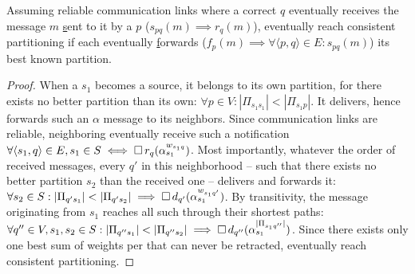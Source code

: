 \begin{theorem}
%
Assuming reliable communication links where a correct \process $q$
eventually receives the message $m$ \underline{s}ent to it by a
\process $p$ ($s_{pq}(m) \implies r_{q}(m)$), \processes eventually
reach consistent partitioning if each \process eventually
\underline{f}orwards ($f_p(m) \implies \forall \langle p, q\rangle \in
E: s_{pq}(m)$) its best known partition.
\end{theorem}

 

\begin{proof}
  When a \process $s_1$ becomes a source, it belongs to its own
  partition, for there exists no better partition than its own:
  $\forall p \in V: |\Pi_{s_1 s_1}| < |\Pi_{s_1 p}|$. It delivers,
  hence forwards such an $\alpha$ message to its neighbors. Since
  communication links are reliable, neighboring \processes eventually
  receive such a notification $\forall \langle s_1, q \rangle \in E,
  s_1 \in S \iff \square\, r_q(\alpha_{s_1}^{w_{s_1 q}})$. Most
  importantly, whatever the order of received messages, every \process
  $q'$ in this neighborhood -- such that there exists no better
  partition $s_2$ than the received one -- delivers and forwards it:
  $\forall s_2 \in S: |\Pi_{q' s_1}| < |\Pi_{q' s_2}| \implies
  \square\, d_{q'}(\alpha_{s_1}^{w_{s_1 q'}})$. By transitivity, the
  message originating from $s_1$ reaches all such \processes through
  their shortest paths: $\forall q'' \in V, s_1, s_2 \in S: |\Pi_{q''
    s_1}| < |\Pi_{q'' s_2}| \implies \square\,
  d_{q''}(\alpha_{s_1}^{|\Pi_{s_1 q''}|})$.  Since there exists only
  one best sum of weights per \process that can never be retracted,
  \processes eventually reach consistent partitioning.
\end{proof}

